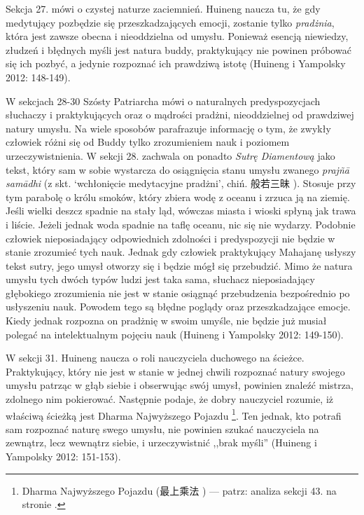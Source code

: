 Sekcja 27. mówi o czystej naturze zaciemnień.
Huineng naucza tu, że gdy medytujący pozbędzie się przeszkadzających emocji, zostanie tylko \textit{pradżnia}, która jest zawsze obecna i nieoddzielna od umysłu.
Ponieważ esencją niewiedzy, złudzeń i błędnych myśli jest natura buddy, praktykujący nie powinen próbować się ich pozbyć, a jedynie rozpoznać ich prawdziwą istotę
(Huineng i Yampolsky 2012: 148-149).

W sekcjach 28-30 Szósty Patriarcha mówi o naturalnych predyspozycjach słuchaczy i praktykujących oraz o mądrości pradżni, nieoddzielnej od prawdziwej natury umysłu.
Na wiele sposobów parafrazuje informację o tym, że zwykły człowiek różni się od Buddy tylko zrozumieniem nauk i poziomem urzeczywistnienia.
W sekcji 28. zachwala on ponadto \textit{Sutrę Diamentową} jako tekst, który sam w sobie wystarcza do osiągnięcia stanu umysłu zwanego \textit{prajñā samādhi} (z skt. `wchłonięcie medytacyjne pradżni', chiń. 般若三昧 ).
Stosuje przy tym parabolę o królu smoków, który zbiera wodę z oceanu i zrzuca ją na ziemię.
Jeśli wielki deszcz spadnie na stały ląd, wówczas miasta i wioski spłyną jak trawa i liście.
Jeżeli jednak woda spadnie na taflę oceanu, nic się nie wydarzy.
Podobnie człowiek nieposiadający odpowiednich zdolności i predyspozycji nie będzie w stanie zrozumieć tych nauk.
Jednak gdy człowiek praktykujący Mahajanę usłyszy tekst sutry, jego umysł otworzy się i będzie mógł się przebudzić.
Mimo że natura umysłu tych dwóch typów ludzi jest taka sama, słuchacz nieposiadający głębokiego zrozumienia nie jest w stanie osiągnąć przebudzenia bezpośrednio po usłyszeniu nauk.
Powodem tego są błędne poglądy oraz przeszkadzające emocje.
Kiedy jednak rozpozna on pradżnię w swoim umyśle, nie będzie już musiał polegać na intelektualnym pojęciu nauk
(Huineng i Yampolsky 2012: 149-150).

W sekcji 31. Huineng naucza o roli nauczyciela duchowego na ścieżce.
Praktykujący, który nie jest w stanie w jednej chwili rozpoznać natury swojego umysłu patrząc w głąb siebie i obserwując swój umysł, powinien znaleźć mistrza, zdolnego nim pokierować.
Następnie podaje, że dobry nauczyciel rozumie, iż właściwą ścieżką jest Dharma Najwyższego Pojazdu%
\footnote{Dharma Najwyższego Pojazdu (最上乘法 ) --- patrz: analiza sekcji 43. na stronie \pageref{SiChengFa}.}.%
Ten jednak, kto potrafi sam rozpoznać naturę swego umysłu, nie powinien szukać nauczyciela na zewnątrz, lecz wewnątrz siebie, i urzeczywistnić ,,brak myśli''
(Huineng i Yampolsky 2012: 151-153).

